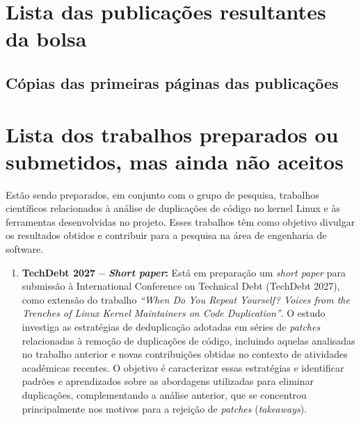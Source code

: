 \documentclass[oneside]{abntlatex}
\begin{document}
\begin{appendixenv}

\section{Lista das publicações resultantes da bolsa}\label{apx:publicacoes-resultantes-da-bolsa}

{
\renewcommand{\newpage}{}
\renewcommand{\clearpage}{}
\renewcommand{\section}[2]{}

}

\subsection{Cópias das primeiras páginas das publicações}



\section{Lista dos trabalhos preparados ou submetidos, mas ainda não aceitos}\label{apx:trabalhos-em-preparacao}

Estão sendo preparados, em conjunto com o grupo de pesquisa, trabalhos científicos relacionados à análise de duplicações de código no kernel Linux e às ferramentas desenvolvidas no projeto. Esses trabalhos têm como objetivo divulgar os resultados obtidos e contribuir para a pesquisa na área de engenharia de software.

\begin{enumerate}
\item \textbf{TechDebt 2027 -- \textit{Short paper}:} Está em preparação um \textit{short paper} para submissão à International Conference on Technical Debt (TechDebt 2027), como extensão do trabalho \textit{``When Do You Repeat Yourself? Voices from the Trenches of Linux Kernel Maintainers on Code Duplication''}\cite{duplicationdry}. O estudo investiga as estratégias de deduplicação adotadas em séries de \textit{patches} relacionadas à remoção de duplicações de código, incluindo aquelas analisadas no trabalho anterior e novas contribuições obtidas no contexto de atividades acadêmicas recentes. O objetivo é caracterizar essas estratégias e identificar padrões e aprendizados sobre as abordagens utilizadas para eliminar duplicações, complementando a análise anterior, que se concentrou principalmente nos motivos para a rejeição de \textit{patches} (\textit{takeaways}).


\end{enumerate}
\end{appendixenv}
\end{document}
